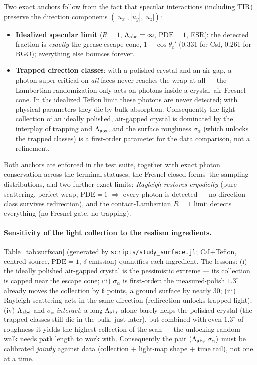 \documentclass[11pt,a4paper]{article}
\newcommand{\csi}{CsI}
\newcommand{\bgo}{BGO}
\begin{document}
Two exact anchors follow from the fact that specular interactions (including TIR)
preserve the direction components $(|u_x|,|u_y|,|u_z|)$:
\begin{itemize}
  \item \textbf{Idealized specular limit} ($R=1$, $\Lambda_{\rm abs}=\infty$,
    $\mathrm{PDE}=1$, ESR): the detected fraction is \emph{exactly} the grease escape
    cone, $1-\cos\theta_c'$ (0.331 for \csi{}, 0.261 for \bgo{}); everything else bounces
    forever.
  \item \textbf{Trapped direction classes}: with a polished crystal and an air gap, a
    photon super-critical on \emph{all} faces never reaches the wrap at all --- the
    Lambertian randomization only acts on photons inside a crystal--air Fresnel cone. In
    the idealized Teflon limit these photons are never detected; with physical parameters
    they die by bulk absorption. Consequently the light collection of an ideally polished,
    air-gapped crystal is dominated by the interplay of trapping and
    $\Lambda_{\rm abs}$, and the surface roughness $\sigma_\alpha$ (which unlocks the
    trapped classes) is a first-order parameter for the data comparison, not a refinement.
\end{itemize}
Both anchors are enforced in the test suite, together with exact photon conservation
across the terminal statuses, the Fresnel closed forms, the sampling distributions, and two
further exact limits: \emph{Rayleigh restores ergodicity} (pure scattering, perfect wrap,
$\mathrm{PDE}=1$ $\Rightarrow$ every photon is detected --- no direction class survives
redirection), and the contact-Lambertian $R=1$ limit detects everything (no Fresnel gate,
no trapping).

\paragraph{Sensitivity of the light collection to the realism ingredients.}
Table~\ref{tab:surfscan} (generated by \texttt{scripts/study\_surface.jl};
\csi{}+Teflon, centred source, $\mathrm{PDE}=1$, $\delta$ emission) quantifies each
ingredient. The lessons: (i) the ideally polished air-gapped crystal is the pessimistic
extreme --- its collection is capped near the escape cone; (ii) $\sigma_\alpha$ is
first-order: the measured-polish $1.3^\circ$ already moves the collection by 6 points, a
ground surface by nearly 30; (iii) Rayleigh scattering acts in the same direction
(redirection unlocks trapped light); (iv) $\Lambda_{\rm abs}$ and $\sigma_\alpha$
\emph{interact}: a long $\Lambda_{\rm abs}$ alone barely helps the polished crystal (the
trapped classes still die in the bulk, just later), but combined with even $1.3^\circ$ of
roughness it yields the highest collection of the scan --- the unlocking random walk needs
path length to work with. Consequently the pair
$(\Lambda_{\rm abs}, \sigma_\alpha)$ must be calibrated \emph{jointly} against data
(collection + light-map shape + time tail), not one at a time.
\end{document}
